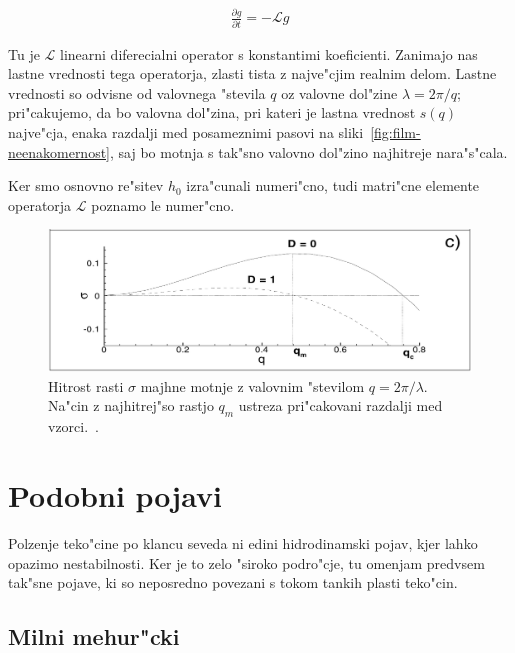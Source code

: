 \documentclass[a4paper,10pt]{article}
\newcommand{\odv}[1]{\frac{\partial #1}{\partial t}}
\begin{document}
\begin{align}
 \odv{g} = -\mathcal{L}g
\end{align}

Tu je $\mathcal{L}$ linearni diferecialni operator s konstantimi koeficienti. Zanimajo nas lastne vrednosti tega operatorja, zlasti tista z najve"cjim realnim delom. Lastne vrednosti so odvisne od valovnega "stevila $q$ oz valovne dol"zine $\lambda = 2\pi/q$; pri"cakujemo, da bo valovna dol"zina, pri kateri je lastna vrednost $s(q)$ najve"cja, enaka razdalji med posameznimi pasovi na sliki~\ref{fig:film-neenakomernost}, saj bo motnja s tak"sno valovno dol"zino najhitreje nara"s"cala. 

Ker smo osnovno re"sitev $h_0$ izra"cunali numeri"cno, tudi matri"cne elemente operatorja $\mathcal{L}$ poznamo le numer"cno. 

\begin{figure}[h]
 \centering
 \includegraphics[width=.8\textwidth]{./Slike/film-stabilnost}
 \caption{Hitrost rasti $\sigma$ majhne motnje z valovnim "stevilom $q=2\pi/\lambda$. Na"cin z najhitrej"so rastjo $q_m$ ustreza pri"cakovani razdalji med vzorci.~\cite{kondic}. }
 \label{fig:film-osnovna}
\end{figure}

\section{Podobni pojavi}

Polzenje teko"cine po klancu seveda ni edini hidrodinamski pojav, kjer lahko opazimo nestabilnosti. Ker je to zelo "siroko podro"cje, tu omenjam predvsem tak"sne pojave, ki so neposredno povezani s tokom tankih plasti teko"cin. 

\subsection{Milni mehur"cki}
\end{document}
